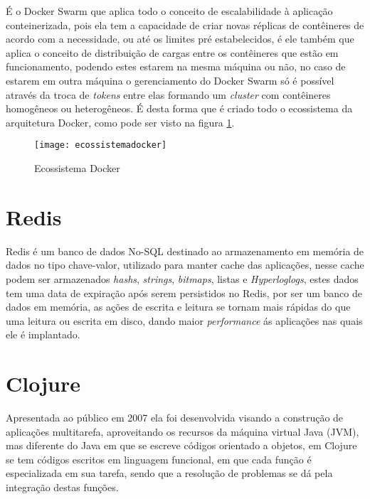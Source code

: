 É o Docker Swarm que aplica todo o conceito de escalabilidade à aplicação conteinerizada, pois ela tem a capacidade de criar novas réplicas de contêineres de acordo com a necessidade, ou até os limites pré estabelecidos, é ele também que aplica o conceito de distribuição de cargas entre os contêineres que estão em funcionamento, podendo estes estarem na mesma máquina ou não, no caso de estarem em outra máquina o gerenciamento do Docker Swarm só é possível através da troca de \textit{tokens} entre elas formando um \textit{cluster} com contêineres homogêneos ou heterogêneos. É desta forma que é criado todo o ecossistema da arquitetura Docker, como pode ser visto na figura \ref{fig:ecossistemadocker}.~\cite{dockerswarm}  

\begin{figure}[!h]
\caption{\label{fig:ecossistemadocker} Ecossistema Docker}
\begin{center}
\texttt{[image: ecossistemadocker]}
\end{center}
\end{figure}

\section{Redis}
\label{sec:redis}
Redis é um banco de dados No-SQL destinado ao armazenamento em memória de dados no tipo chave-valor, utilizado para manter cache das aplicações, nesse cache podem ser armazenados \textit{hashs}, \textit{strings}, \textit{bitmaps}, listas e \textit{Hyperloglogs}, estes dados tem uma data de expiração após serem persistidos no Redis, por ser um banco de dados em memória, as ações de escrita e leitura se tornam mais rápidas do que uma leitura ou escrita em disco, dando maior \textit{performance} ás aplicações nas quais ele é implantado.~\cite{da2015redis}

\section{Clojure}
Apresentada ao público em 2007 ela foi desenvolvida visando a construção de aplicações multitarefa, aproveitando os recursos da máquina virtual Java (JVM), mas diferente do Java em que se escreve códigos orientado a objetos, em Clojure se tem códigos escritos em linguagem funcional, em que cada função é especializada em sua tarefa, sendo que a resolução de problemas se dá pela integração destas funções.

